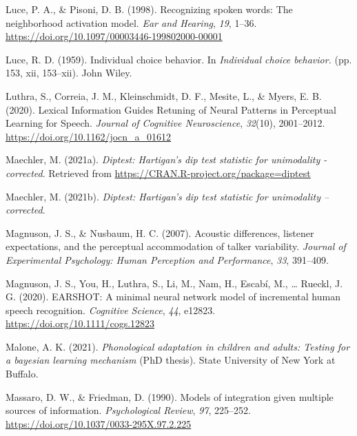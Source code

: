 \documentclass[
  11pt,
  english,
  man,floatsintext]{apa6}
\newlength{\cslhangindent}
\newlength{\cslentryspacingunit} %
\newenvironment{CSLReferences}[2] %
 {%
  \setlength{\parindent}{0pt}
  \ifodd #1
  \let\oldpar\par
  \def\par{\hangindent=\cslhangindent\oldpar}
  \fi
  \setlength{\parskip}{#2\cslentryspacingunit}
 }%
 {}
\begin{document}
\begin{CSLReferences}{1}{0}
\leavevmode{}%
Luce, P. A., \& Pisoni, D. B. (1998). Recognizing spoken words: The neighborhood activation model. \emph{Ear and Hearing}, \emph{19}, 1--36. \url{https://doi.org/10.1097/00003446-199802000-00001}

\leavevmode{}%
Luce, R. D. (1959). Individual choice behavior. In \emph{Individual choice behavior.} (pp. 153, xii, 153--xii). John Wiley.

\leavevmode{}%
Luthra, S., Correia, J. M., Kleinschmidt, D. F., Mesite, L., \& Myers, E. B. (2020). {Lexical Information Guides Retuning of Neural Patterns in Perceptual Learning for Speech}. \emph{Journal of Cognitive Neuroscience}, \emph{32}(10), 2001--2012. \url{https://doi.org/10.1162/jocn_a_01612}

\leavevmode{}%
Maechler, M. (2021a). \emph{Diptest: Hartigan's dip test statistic for unimodality - corrected}. Retrieved from \url{https://CRAN.R-project.org/package=diptest}

\leavevmode{}%
Maechler, M. (2021b). \emph{Diptest: Hartigan's dip test statistic for unimodality -- corrected}.

\leavevmode{}%
Magnuson, J. S., \& Nusbaum, H. C. (2007). Acoustic differences, listener expectations, and the perceptual accommodation of talker variability. \emph{Journal of Experimental Psychology: Human Perception and Performance}, \emph{33}, 391--409.

\leavevmode{}%
Magnuson, J. S., You, H., Luthra, S., Li, M., Nam, H., Escabí, M., \ldots{} Rueckl, J. G. (2020). EARSHOT: A minimal neural network model of incremental human speech recognition. \emph{Cognitive Science}, \emph{44}, e12823. \url{https://doi.org/10.1111/cogs.12823}

\leavevmode{}%
Malone, A. K. (2021). \emph{Phonological adaptation in children and adults: Testing for a bayesian learning mechanism} (PhD thesis). State University of New York at Buffalo.

\leavevmode{}%
Massaro, D. W., \& Friedman, D. (1990). Models of integration given multiple sources of information. \emph{Psychological Review}, \emph{97}, 225--252. \url{https://doi.org/10.1037/0033-295X.97.2.225}


\end{CSLReferences}
\end{document}

